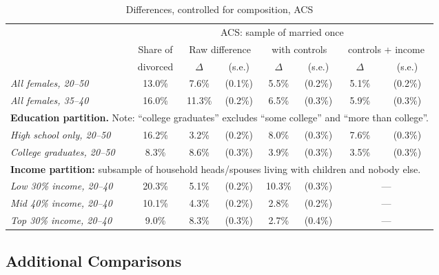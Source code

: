 \documentclass[12pt,letter]{article}
\begin{document}
\begin{table}
\begin{center}
\begin{tabular}{|l|c||c|c|c|c|c|c|}\cline{2-8}
\multicolumn{1}{c|}{} & \multicolumn{7}{c|}{ACS: sample of married once}\\\cline{2-8}
\multicolumn{1}{c|}{} & \small Share of &\multicolumn{2}{c|}{\small Raw difference} & \multicolumn{2}{c|}{\small with controls} & \multicolumn{2}{c|}{\small controls + income} \\ \cline{3-8}
\multicolumn{1}{c|}{} & \small divorced & $\Delta$ & (s.e.) & $\Delta$ & (s.e.) & $\Delta$ & (s.e.) \\  \hline
\textit{All females, 20--50} & 13.0\% & 7.6\% & (0.1\%) & 5.5\% & (0.2\%) & 5.1\% & (0.2\%) \\
\textit{All females, 35--40} & 16.0\% & 11.3\% & (0.2\%) & 6.5\% & (0.3\%) & 5.9\% & (0.3\%) \\\hline\hline
\multicolumn{8}{|p{0.9\linewidth}|}{\footnotesize \textbf{Education partition.} Note: ``college graduates'' excludes ``some college'' and ``more than college''.}\\\hline
\textit{High school only, 20--50} & 16.2\% & 3.2\% & (0.2\%) & 8.0\% & (0.3\%) & 7.6\% & (0.3\%) \\
\textit{College graduates, 20--50} & 8.3\% & 8.6\% & (0.3\%) & 3.9\% & (0.3\%) & 3.5\% & (0.3\%) \\\hline\hline
\multicolumn{8}{|p{0.9\linewidth}|}{\footnotesize \textbf{Income partition:} subsample of household heads/spouses living with children and nobody else.}\\\hline
\textit{Low 30\% income, 20--40} & 20.3\% & 5.1\% & (0.2\%) & 10.3\% & (0.3\%) & \multicolumn{2}{c|}{---}\\
\textit{Mid 40\% income, 20--40} & 10.1\% & 4.3\% & (0.2\%) & 2.8\% & (0.2\%) & \multicolumn{2}{c|}{---}\\
\textit{Top 30\% income, 20--40} & 9.0\% & 8.3\% & (0.3\%) & 2.7\% & (0.4\%) & \multicolumn{2}{c|}{---}\\
\hline
\end{tabular}
\caption{Differences, controlled for composition, ACS\label{diff-contr}}
\end{center}
\end{table}
\subsection{Additional Comparisons}
\end{document}
